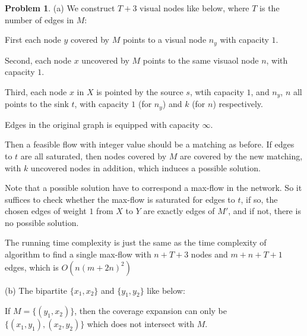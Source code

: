 \documentclass[a4paper]{article}
\theoremstyle{definition}
\newtheorem{problem}{Problem}
\theoremstyle{plain}
\numberwithin{equation}{problem}
\begin{document}
\begin{problem}
    (a) 
    We construct  $ T+3 $ visual nodes like below, where  $ T $ is the number of edges in  $ M $:
    
    First each node  $ y $  covered by  $ M  $ points to a visual node  $ n_y $ with capacity  $ 1 $.
    
    Second, each node  $ x $ uncovered by  $ M  $ points to the same visuaol node  $ n $, with capacity  $ 1 $.
    
    Third, each node  $ x $ in  $ X $  is pointed by the source $ s $, wtih capacity  $ 1 $, and  $ n_y $, $ n $ all points to the sink $ t $, with capacity  $ 1 $ (for  $ n_y $) and  $ k $ (for  $ n $) respectively.      

    Edges in the original graph is equipped with capacity  $ \infty $.
    
    Then a feasible flow with integer value should be a matching as before. If edges to  $ t $ are all saturated, then nodes covered by  $ M  $ are covered by the new matching, with  $ k $ uncovered nodes in addition, which induces a possible solution.

    Note that a possible solution have to correspond a max-flow in the network. So it suffices to check whether the max-flow is saturated for edges to  $ t $, if so, the chosen edges of weight  $ 1 $ from  $ X $ to  $ Y$ are exactly edges of  $ M' $, and if not, there is no possible solution.    

    The running time complexity is just the same as the time complexity of algorithm to find a single max-flow with  $ n+T+3 $ nodes and  $ m+n+T+1 $ edges, which is  $ O(n(m+2n)^2) $   



    (b) The bipartite  $ \{x_1,x_2\} $ and  $ \{y_1,y_2\} $ like below: 

    \begin{center}
    \end{center}

    If  $ M=\{(y_1,x_2)\} $, then the coverage expansion can only be  $ \{(x_1,y_1),(x_2,y_2)\} $ which does not intersect with  $ M $.  


\end{problem}
\end{document}
